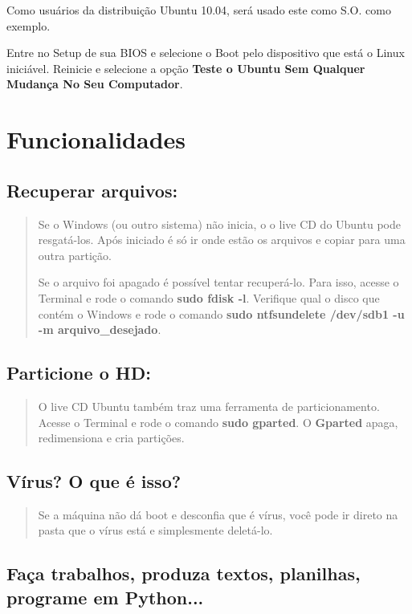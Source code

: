\documentclass[12pt, a4paper, tocpage=plain]{abnt} %
\begin{document}
Como usuários da distribuição Ubuntu 10.04, será usado este como S.O. como exemplo.

Entre no Setup de sua BIOS e selecione o Boot pelo dispositivo que está o Linux iniciável. Reinicie e selecione a opção {\bf Teste o Ubuntu Sem Qualquer Mudança No Seu Computador}.

\chapter{Funcionalidades}


\section{Recuperar arquivos:}

\begin{quote}
Se o Windows (ou outro sistema) não inicia, o o live CD do Ubuntu pode resgatá-los. Após iniciado é só ir onde estão os arquivos e copiar para uma outra partição. 

Se o arquivo foi apagado é possível tentar recuperá-lo. Para isso, acesse o Terminal e rode o comando  {\bf sudo fdisk -l}. Verifique qual o disco que contém o Windows e rode o comando {\bf sudo ntfsundelete /dev/sdb1 -u -m arquivo\_desejado}.
\end{quote}

\section{Particione o HD:}

\begin{quote}
O live CD Ubuntu também traz uma ferramenta de particionamento. Acesse o Terminal e rode o comando {\bf sudo gparted}. O {\bf Gparted} apaga, redimensiona e cria partições.
\end{quote}

\section{Vírus? O que é isso?}

\begin{quote}
Se a máquina não dá boot e desconfia que é vírus, você pode ir direto na pasta que o vírus está e simplesmente deletá-lo.
\end{quote}

\section{Faça trabalhos, produza textos, planilhas, programe em Python...}
\end{document}
